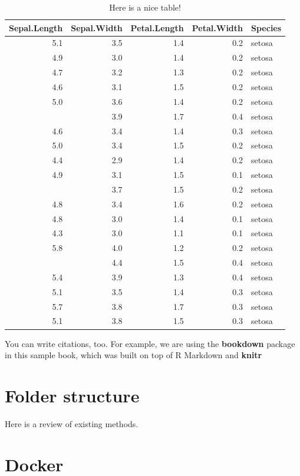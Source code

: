 \documentclass[]{book}
\theoremstyle{definition}
\theoremstyle{definition}
\theoremstyle{remark}
\begin{document}
\begin{table}

\caption{\label{tab:nice-tab}Here is a nice table!}
\centering
\begin{tabular}[t]{rrrrl}
\toprule
Sepal.Length & Sepal.Width & Petal.Length & Petal.Width & Species\\
\midrule
5.1 & 3.5 & 1.4 & 0.2 & setosa\\
4.9 & 3.0 & 1.4 & 0.2 & setosa\\
4.7 & 3.2 & 1.3 & 0.2 & setosa\\
4.6 & 3.1 & 1.5 & 0.2 & setosa\\
5.0 & 3.6 & 1.4 & 0.2 & setosa\\
\addlinespace
5.4 & 3.9 & 1.7 & 0.4 & setosa\\
4.6 & 3.4 & 1.4 & 0.3 & setosa\\
5.0 & 3.4 & 1.5 & 0.2 & setosa\\
4.4 & 2.9 & 1.4 & 0.2 & setosa\\
4.9 & 3.1 & 1.5 & 0.1 & setosa\\
\addlinespace
5.4 & 3.7 & 1.5 & 0.2 & setosa\\
4.8 & 3.4 & 1.6 & 0.2 & setosa\\
4.8 & 3.0 & 1.4 & 0.1 & setosa\\
4.3 & 3.0 & 1.1 & 0.1 & setosa\\
5.8 & 4.0 & 1.2 & 0.2 & setosa\\
\addlinespace
5.7 & 4.4 & 1.5 & 0.4 & setosa\\
5.4 & 3.9 & 1.3 & 0.4 & setosa\\
5.1 & 3.5 & 1.4 & 0.3 & setosa\\
5.7 & 3.8 & 1.7 & 0.3 & setosa\\
5.1 & 3.8 & 1.5 & 0.3 & setosa\\
\bottomrule
\end{tabular}
\end{table}

You can write citations, too. For example, we are using the
\textbf{bookdown} package \citep{R-bookdown} in this sample book, which
was built on top of R Markdown and \textbf{knitr}

\chapter{Folder structure}\label{folder-structure}

Here is a review of existing methods.

\chapter{Docker}\label{docker}
\end{document}
